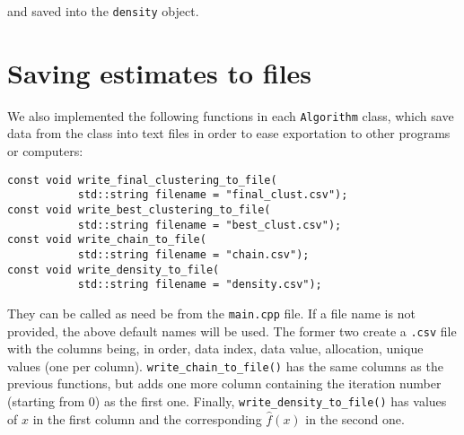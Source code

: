 and saved into the \verb|density| object.

\section{Saving estimates to files}
We also implemented the following functions in each \verb|Algorithm| class, which save data from the class into text files in order to ease exportation to other programs or computers:
\begin{verbatim}
const void write_final_clustering_to_file(
           std::string filename = "final_clust.csv");
const void write_best_clustering_to_file(
           std::string filename = "best_clust.csv");
const void write_chain_to_file(
           std::string filename = "chain.csv");
const void write_density_to_file(
           std::string filename = "density.csv");
\end{verbatim}
They can be called as need be from the \verb|main.cpp| file.
If a file name is not provided, the above default names will be used.
The former two create a \verb|.csv| file with the columns being, in order, data index, data value, allocation, unique values (one per column).
\verb|write_chain_to_file()| has the same columns as the previous functions, but adds one more column containing the iteration number (starting from $0$) as the first one.
Finally, \verb|write_density_to_file()| has values of $x$ in the first column and the corresponding $\hat f(x)$ in the second one.

